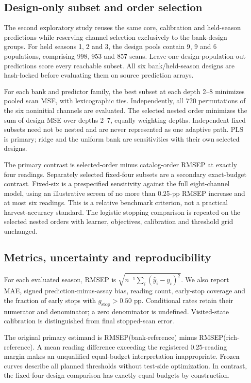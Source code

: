 \documentclass[11pt,a4paper]{article}
\begin{document}
\subsection{Design-only subset and order selection}
The second exploratory study reuses the same core, calibration and held-season predictions while reserving channel selection exclusively to the bank-design groups. For held seasons 1, 2 and 3, the design pools contain 9, 9 and 6 populations, comprising 998, 953 and 857 scans. Leave-one-design-population-out predictions score every reachable subset. All six bank/held-season designs are hash-locked before evaluating them on source prediction arrays.

For each bank and predictor family, the best subset at each depth 2--8 minimizes pooled scan MSE, with lexicographic ties. Independently, all 720 permutations of the six noninitial channels are evaluated. The selected nested order minimizes the sum of design MSE over depths 2--7, equally weighting depths. Independent fixed subsets need not be nested and are never represented as one adaptive path. PLS is primary; ridge and the uniform bank are sensitivities with their own selected designs.

The primary contrast is selected-order minus catalog-order RMSEP at exactly four readings. Separately selected fixed-four subsets are a secondary exact-budget contrast. Fixed-six is a prespecified sensitivity against the full eight-channel model, using an illustrative screen of no more than 0.25-pp RMSEP increase and at most six readings. This is a relative benchmark criterion, not a practical harvest-accuracy standard. The logistic stopping comparison is repeated on the selected nested orders with learner, objectives, calibration and threshold grid unchanged.

\subsection{Metrics, uncertainty and reproducibility}
For each evaluated season, RMSEP is $\sqrt{n^{-1}\sum_i(\hat y_i-y_i)^2}$. We also report MAE, signed prediction-minus-assay bias, reading count, early-stop coverage and the fraction of early stops with $g_{\mathrm{stop}}>0.50$ pp. Conditional rates retain their numerator and denominator; a zero denominator is undefined. Visited-state calibration is distinguished from final stopped-scan error.

The original primary estimand is RMSEP(bank-reference) minus RMSEP(rich-reference). A mean reading difference exceeding the registered 0.25-reading margin makes an unqualified equal-budget interpretation inappropriate. Frozen curves describe all planned thresholds without test-side optimization. In contrast, the fixed-four design comparison has exactly equal budgets by construction.
\end{document}
